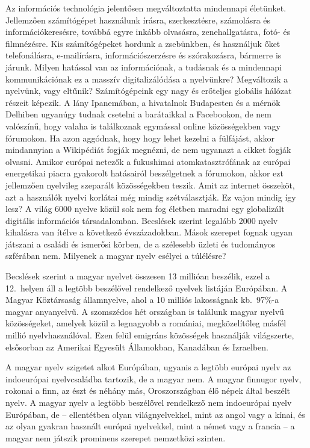 \begin{multicols}{2}
Az információs technológia jelentősen megváltoztatta mindennapi életünket. Jel\-lem\-ző\-en számítógépet használunk írásra, szerkesztésre, számolásra és in\-for\-má\-ció\-ke\-re\-sés\-re, továbbá egyre inkább olvasásra, zenehallgatásra, fotó- és filmnézésre. Kis szá\-mí\-tó\-gé\-pe\-ket hordunk a zsebünkben, és használjuk őket telefonálásra, e-mailírásra, információszerzésre és szórakozásra, bármerre is járunk. Milyen hatással van az információnak, a tudásnak és a mindennapi kommunikációnak ez a masszív digitalizálódása a nyelvünkre? Megváltozik a nyelvünk, vagy eltűnik? 
Számítógépeink egy nagy és erőteljes globális hálózat részeit képezik. A lány Ipa\-ne\-má\-ban, a hivatalnok Budapesten és a mérnök Delhiben ugyanúgy tudnak csetelni a barátaikkal a Facebookon, de nem valószínű, hogy valaha is találkoznak egymással online közösségekben vagy fórumokon. Ha azon aggódnak, hogy hogy lehet kezelni a fülfájást, akkor mindannyian a Wikipédiát fogják megnézni, de nem ugyanazt a cikket fogják olvasni. Amikor európai netezők a fukushimai atomkatasztrófának az európai energetikai piacra gyakorolt hatásairól beszélgetnek a fórumokon, akkor ezt jellemzően nyelvileg szeparált közösségekben teszik. Amit az internet összeköt, azt a használók nyelvi korlátai még mindig szétválasztják. Ez vajon mindig így lesz?
A világ 6000 nyelve közül sok nem fog életben maradni egy globalizált digitális információs társadalomban. Becslések szerint legalább 2000 nyelv kihalásra van ítélve a következő évszázadokban. Mások szerepet fognak ugyan játszani a családi és ismerősi körben, de a szélesebb üzleti és tudományos szférában nem. Milyenek a magyar nyelv esélyei a túlélésre?

Becs\-lé\-sek szerint a magyar nyelvet összesen 13 millióan beszélik, ezzel a 12.~helyen áll a legtöbb beszélővel rendelkező nyelvek listáján Európában. A Magyar Köztársaság államnyelve, ahol a 10 milliós lakosságnak kb.~97\%-a magyar anyanyelvű. A szomszédos hét országban is találunk ma\-gyar nyelvű közösségeket, amelyek közül a legnagyobb a romániai, megközelítőleg másfél millió nyelvhasználóval. Ezen felül emig\-ráns közösségek használják világszerte, elsősorban az Amerikai Egyesült Államokban, Kanadában és Izraelben.   

A magyar nyelv szigetet alkot Európában, ugyanis a legtöbb európai nyelv az indoeurópai nyelvcsaládba tartozik, de a magyar nem. A magyar finnugor nyelv, rokonai a finn, az észt és néhány más, Oroszországban élő népek által beszélt nyelv. A magyar nyelv a legtöbb beszélővel rendelkező nem indoeurópai nyelv Európában, de -- ellentétben olyan világnyelvekkel, mint az angol vagy a kínai, és az olyan gyakran használt európai nyelvekkel, mint a német vagy a francia -- a magyar nem játszik prominens szerepet nemzetközi szinten. 


\end{multicols}
